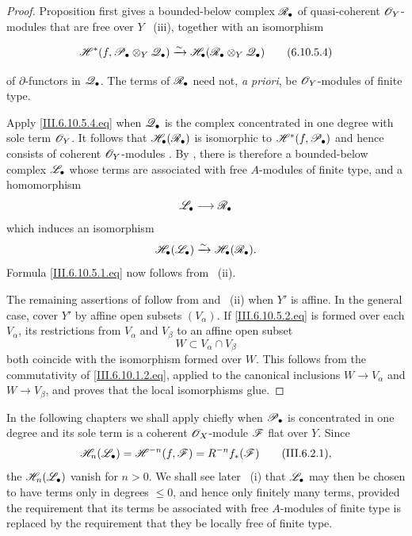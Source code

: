 \begin{proof}
Proposition  first gives a bounded-below
complex $\mathscr{R}_\bullet$  of quasi-coherent
$\mathscr{O}_Y$-modules that are free over $Y$
~(iii), together with an isomorphism
\begin{env}[6.10.5.4]
\label{III.6.10.5.4}
\[
  \mathscr{H}^*
  (f,\mathscr{P}_\bullet\otimes_Y\mathscr{Q}_\bullet)
  \xrightarrow{\sim}
  \mathscr{H}_\bullet
  (\mathscr{R}_\bullet\otimes_Y\mathscr{Q}_\bullet)
  \tag{6.10.5.4}\label{III.6.10.5.4.eq}
\]
\end{env}
of $\partial$-functors in $\mathscr{Q}_\bullet$.  The terms of
$\mathscr{R}_\bullet$ need not, \emph{a priori}, be
$\mathscr{O}_Y$-modules of finite type.

Apply \eqref{III.6.10.5.4.eq} when $\mathscr{Q}_\bullet$ is the
complex concentrated in one degree with sole term $\mathscr{O}_Y$.
It follows that $\mathscr{H}_\bullet(\mathscr{R}_\bullet)$ is isomorphic to
$\mathscr{H}^*(f,\mathscr{P}_\bullet)$ and hence consists of coherent
$\mathscr{O}_Y$-modules .  By
, there is therefore a bounded-below complex
$\mathscr{L}_\bullet$ whose terms are associated with free
$A$-modules of finite type, and a homomorphism
\[
  \mathscr{L}_\bullet\longrightarrow\mathscr{R}_\bullet
\]
which induces an isomorphism
\[
  \mathscr{H}_\bullet(\mathscr{L}_\bullet)
  \xrightarrow{\sim}
  \mathscr{H}_\bullet(\mathscr{R}_\bullet).
\]
Formula \eqref{III.6.10.5.1.eq} now follows from
~(ii).

The remaining assertions of  follow from
 and ~(ii) when $Y'$ is
affine.  In the general case, cover $Y'$ by affine open subsets
$(V_\alpha)$.  If
\eqref{III.6.10.5.2.eq} is formed over each $V_\alpha$, its
restrictions from $V_\alpha$ and $V_\beta$ to an affine open
subset
\[
  W\subset V_\alpha\cap V_\beta
\]
both coincide with the isomorphism formed over $W$.  This
follows from the commutativity of
\eqref{III.6.10.1.2.eq}, applied to the canonical inclusions
$W\to V_\alpha$ and $W\to V_\beta$, and proves that the local
isomorphisms glue.
\end{proof}

\begin{remark}[6.10.6]
\label{III.6.10.6}
In the following chapters we shall apply 
chiefly when $\mathscr{P}_\bullet$ is concentrated in one degree and
its sole term is a coherent $\mathscr{O}_X$-module $\mathscr{F}$ flat over
$Y$.  Since
\[
  \mathscr{H}_n(\mathscr{L}_\bullet)
  =
  \mathscr{H}^{-n}(f,\mathscr{F})
  =
  R^{-n}f_*(\mathscr{F})
  \qquad\text{(III.6.2.1)},
\]
the $\mathscr{H}_n(\mathscr{L}_\bullet)$ vanish for $n>0$.  We shall see
later ~(i) that $\mathscr{L}_\bullet$ may then be
chosen to have terms only in degrees $\leq0$, and hence only
finitely many terms, provided the requirement that its terms
be associated with free $A$-modules of finite type is replaced
by the requirement that they be locally free of finite type.
\end{remark}

